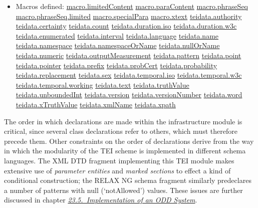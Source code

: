 \begin{description}
\begin{itemize}
\item Macros defined: \hyperref[TEI.macro.limitedContent]{macro.limitedContent} \hyperref[TEI.macro.paraContent]{macro.paraContent} \hyperref[TEI.macro.phraseSeq]{macro.phraseSeq} \hyperref[TEI.macro.phraseSeq.limited]{macro.phraseSeq.limited} \hyperref[TEI.macro.specialPara]{macro.specialPara} \hyperref[TEI.macro.xtext]{macro.xtext} \hyperref[TEI.teidata.authority]{teidata.authority} \hyperref[TEI.teidata.certainty]{teidata.certainty} \hyperref[TEI.teidata.count]{teidata.count} \hyperref[TEI.teidata.duration.iso]{teidata.duration.iso} \hyperref[TEI.teidata.duration.w3c]{teidata.duration.w3c} \hyperref[TEI.teidata.enumerated]{teidata.enumerated} \hyperref[TEI.teidata.interval]{teidata.interval} \hyperref[TEI.teidata.language]{teidata.language} \hyperref[TEI.teidata.name]{teidata.name} \hyperref[TEI.teidata.namespace]{teidata.namespace} \hyperref[TEI.teidata.namespaceOrName]{teidata.namespaceOrName} \hyperref[TEI.teidata.nullOrName]{teidata.nullOrName} \hyperref[TEI.teidata.numeric]{teidata.numeric} \hyperref[TEI.teidata.outputMeasurement]{teidata.outputMeasurement} \hyperref[TEI.teidata.pattern]{teidata.pattern} \hyperref[TEI.teidata.point]{teidata.point} \hyperref[TEI.teidata.pointer]{teidata.pointer} \hyperref[TEI.teidata.prefix]{teidata.prefix} \hyperref[TEI.teidata.probCert]{teidata.probCert} \hyperref[TEI.teidata.probability]{teidata.probability} \hyperref[TEI.teidata.replacement]{teidata.replacement} \hyperref[TEI.teidata.sex]{teidata.sex} \hyperref[TEI.teidata.temporal.iso]{teidata.temporal.iso} \hyperref[TEI.teidata.temporal.w3c]{teidata.temporal.w3c} \hyperref[TEI.teidata.temporal.working]{teidata.temporal.working} \hyperref[TEI.teidata.text]{teidata.text} \hyperref[TEI.teidata.truthValue]{teidata.truthValue} \hyperref[TEI.teidata.unboundedInt]{teidata.unboundedInt} \hyperref[TEI.teidata.version]{teidata.version} \hyperref[TEI.teidata.versionNumber]{teidata.versionNumber} \hyperref[TEI.teidata.word]{teidata.word} \hyperref[TEI.teidata.xTruthValue]{teidata.xTruthValue} \hyperref[TEI.teidata.xmlName]{teidata.xmlName} \hyperref[TEI.teidata.xpath]{teidata.xpath}
\end{itemize} 
\end{description} \par
The order in which declarations are made within the infrastructure module is critical, since several class declarations refer to others, which must therefore precede them. Other constraints on the order of declarations derive from the way in which the modularity of the TEI scheme is implemented in different schema languages. The XML DTD fragment implementing this TEI module makes extensive use of \textit{parameter entities} and \textit{marked sections} to effect a kind of conditional construction; the RELAX NG schema fragment similarly predeclares a number of patterns with null (‘notAllowed’) values. These issues are further discussed in chapter \textit{\hyperref[IM]{23.5.\ Implementation of an ODD System}}.